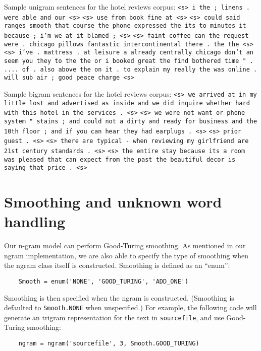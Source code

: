 \documentclass{article}
\begin{document}
Sample unigram sentences for the hotel reviews corpus:\npar
\texttt{<s> i the ; linens . were able and our <s>}\npar
\texttt{<s> use from book fine at <s>}\npar
\texttt{<s> could said ranges smooth that course the phone expressed the its to minutes it because ; i'm we at it blamed ; <s>}\npar
\texttt{<s> faint coffee can the request were . chicago pillows fantastic intercontinental there . the the <s>}\npar
\texttt{<s> i've . mattress . at leisure a already centrally chicago don't an seem you they to the the or i booked great the find bothered time " . .... of . also above the on it . to explain my really the was online . will sub air ; good peace charge <s>}\npar
\bigskip

Sample bigram sentences for the hotel reviews corpus:\npar
\texttt{<s> we arrived at in my little lost and advertised as inside and we did inquire whether hard with this hotel in the services . <s>}\npar
\texttt{<s> we were not want or phone system " stains ; and could not a dirty and ready for business and the 10th floor ; and if you can hear they had earplugs . <s>}\npar
\texttt{<s> prior guest . <s>}\npar
\texttt{<s> there are typical - when reviewing my girlfriend are 21st century standards . <s>}\npar
\texttt{<s> the entire stay because its a room was pleased that can expect from the past the beautiful decor is saying that price . <s>}\npar

\fi

\section{Smoothing and unknown word handling}

Our n-gram model can perform Good-Turing smoothing. As mentioned in our ngram implementation, we are also able to specify the type of smoothing when the ngram class itself is constructed. Smoothing is defined as an ``enum'':

{\small\begin{verbatim}
    Smooth = enum('NONE', 'GOOD_TURING', 'ADD_ONE')
\end{verbatim}}

Smoothing is then specified when the ngram is constructed. (Smoothing is defaulted to \texttt{Smooth.NONE} when unspecified.) For example, the following code will generate an trigram representation for the text in \texttt{sourcefile}, and use Good-Turing smoothing:
{\small\begin{verbatim}
    ngram = ngram('sourcefile', 3, Smooth.GOOD_TURING)
\end{verbatim}}
\end{document}
